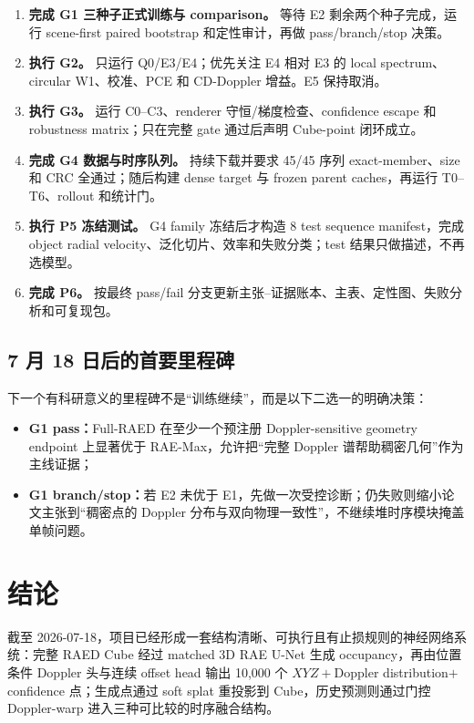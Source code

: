 \documentclass[11pt,a4paper,fontset=none]{ctexart}
\begin{document}
\begin{enumerate}
  \item \textbf{完成 G1 三种子正式训练与 comparison。} 等待 E2 剩余两个种子完成，运行 scene-first paired bootstrap 和定性审计，再做 pass/branch/stop 决策。
  \item \textbf{执行 G2。} 只运行 Q0/E3/E4；优先关注 E4 相对 E3 的 local spectrum、circular W1、校准、PCE 和 CD-Doppler 增益。E5 保持取消。
  \item \textbf{执行 G3。} 运行 C0--C3、renderer 守恒/梯度检查、confidence escape 和 robustness matrix；只在完整 gate 通过后声明 Cube-point 闭环成立。
  \item \textbf{完成 G4 数据与时序队列。} 持续下载并要求 45/45 序列 exact-member、size 和 CRC 全通过；随后构建 dense target 与 frozen parent caches，再运行 T0--T6、rollout 和统计门。
  \item \textbf{执行 P5 冻结测试。} G4 family 冻结后才构造 8 test sequence manifest，完成 object radial velocity、泛化切片、效率和失败分类；test 结果只做描述，不再选模型。
  \item \textbf{完成 P6。} 按最终 pass/fail 分支更新主张--证据账本、主表、定性图、失败分析和可复现包。
\end{enumerate}

\subsection{7 月 18 日后的首要里程碑}

下一个有科研意义的里程碑不是“训练继续”，而是以下二选一的明确决策：
\begin{itemize}
  \item \textbf{G1 pass：}Full-RAED 在至少一个预注册 Doppler-sensitive geometry endpoint 上显著优于 RAE-Max，允许把“完整 Doppler 谱帮助稠密几何”作为主线证据；
  \item \textbf{G1 branch/stop：}若 E2 未优于 E1，先做一次受控诊断；仍失败则缩小论文主张到“稠密点的 Doppler 分布与双向物理一致性”，不继续堆时序模块掩盖单帧问题。
\end{itemize}

\section{结论}

截至 2026-07-18，项目已经形成一套结构清晰、可执行且有止损规则的神经网络系统：完整 RAED Cube 经过 matched 3D RAE U-Net 生成 occupancy，再由位置条件 Doppler 头与连续 offset head 输出 10,000 个 $XYZ+$Doppler distribution$+$confidence 点；生成点通过 soft splat 重投影到 Cube，历史预测则通过门控 Doppler-warp 进入三种可比较的时序融合结构。
\end{document}
